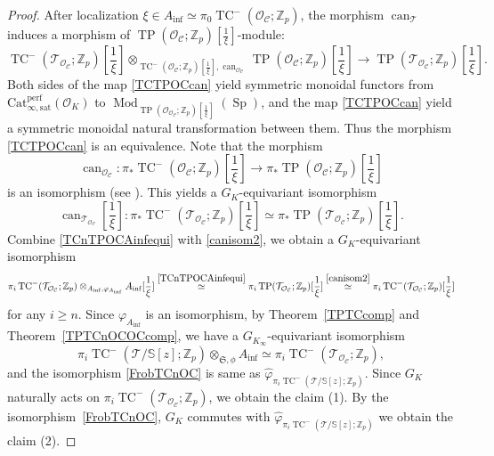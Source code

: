 \documentclass[11pt]{amsart}
\newcommand{\Z}{\mathbb{Z}}
\newcommand{\sO}{\mathcal{O}}
\newcommand{\sT}{\mathcal{T}}
\newcommand{\bS}{\mathbb{S}}
\newcommand{\Mod}{\operatorname{Mod}}
\newcommand{\TP}{\operatorname{TP}}
\newcommand{\TCn}{\operatorname{TC}^{-}}
\newcommand{\Ainf}{A_{\operatorname{inf}}}
\newcommand{\can}{\operatorname{can}}
\newcommand{\Cu}{\mathcal{C}}
\newcommand{\mS}{\mathfrak{S}}
\newcommand{\Catsat}{\operatorname{Cat_{\infty,sat}^{perf}}}
\newcommand{\Sp}{\operatorname{Sp}}
\theoremstyle{definition}
\theoremstyle{remark}
\numberwithin{equation}{section}
\begin{document}
\begin{proof}
After localization $\xi\in \Ainf \simeq \pi_0 \TCn({\sO_{\Cu}};\Z_p)$, the morphism $\can_\sT$ induces a morphism of $\TP(\sO_\Cu;\Z_p)[\frac{1}{\xi}]$-module:
\begin{equation}\label{TCTPOCcan}
\TCn(\sT_{\sO_{\Cu}};\Z_p)[\frac{1}{\xi}] \otimes_{\TCn({\sO_{\Cu}};\Z_p)[\frac{1}{\xi}],\can_{{\sO_{\Cu}}}} \TP({\sO_{\Cu}};\Z_p)[\frac{1}{\xi}] \to \TP(\sT_{\sO_{\Cu}};\Z_p)[\frac{1}{\xi}].
\end{equation}
Both sides of the map \eqref{TCTPOCcan} yield symmetric monoidal functors from $\Catsat(\sO_K)$ to $\Mod_{\TP(\sO_{\sO_{\Cu}};\Z_p)[\frac{1}{\xi}]}(\Sp)$, and the map \eqref{TCTPOCcan} yield a symmetric monoidal natural transformation between them. Thus the morphism \eqref{TCTPOCcan} is an equivalence. Note that the morphism 
\[
\can_{{\sO_{\Cu}}}:\pi_*\TCn({\sO_{\Cu}};\Z_p)[\frac{1}{\xi}] \to \pi_*\TP({\sO_{\Cu}};\Z_p)[\frac{1}{\xi}]
\]
is an isomorphism (see \cite[Proposition 11.10]{BMS2}). This yields a $G_K$-equivariant isomorphism
\begin{equation}\label{canisom2}
\can_{\sT_{\sO_{\Cu}}}[\frac{1}{\xi}]:\pi_*\TCn(\sT_{\sO_{\Cu}};\Z_p)[\frac{1}{\xi}] \simeq \pi_*\TP(\sT_{\sO_{\Cu}};\Z_p)[\frac{1}{\xi}].
\end{equation}
Combine \eqref{TCnTPOCAinfequi} with \eqref{canisom2}, we obtain a $G_K$-equivariant isomorphism
\begin{equation}\label{FrobTCnOC}
\pi_i\TCn(\sT_{\sO_\Cu};\Z_p)\otimes_{\Ainf,\varphi_{\Ainf}} \Ainf[\frac{1}{\xi}]\overset{\eqref{TCnTPOCAinfequi}}{\simeq} \pi_i\TP(\sT_{\sO_\Cu};\Z_p)[\frac{1}{\xi}] \overset{\eqref{canisom2}}{\simeq}\pi_i\TCn(\sT_{\sO_{\Cu}};\Z_p)[\frac{1}{\xi}]
\end{equation}
for any $i \geq n$. Since $\varphi_{\Ainf}$ is an isomorphism, by Theorem~\ref{TPTCcomp} and Theorem~\ref{TPTCnOCOCcomp}, we have a $G_{K_\infty}$-equivariant isomorphism
\begin{equation}\label{BIWAKOUP}
\pi_i\TCn(\sT/\bS[z];\Z_p)\otimes_{\mS,\phi}\Ainf\simeq \pi_i\TCn(\sT_{\sO_\Cu};\Z_p),
\end{equation}
 and the isomorphism \eqref{FrobTCnOC} is same as $\widehat{\varphi}_{\pi_i\TCn(\sT/\bS[z];\Z_p)}$. Since $G_K$ naturally acts on $\pi_i\TCn(\sT_{\sO_\Cu};\Z_p)$, we obtain the claim (1). By the isomorphism~\eqref{FrobTCnOC}, $G_K$ commutes with $\widehat{\varphi}_{\pi_i \TCn(\sT/\bS[z];\Z_p)}$ we obtain the claim (2). 
 

\end{proof}
\end{document}
